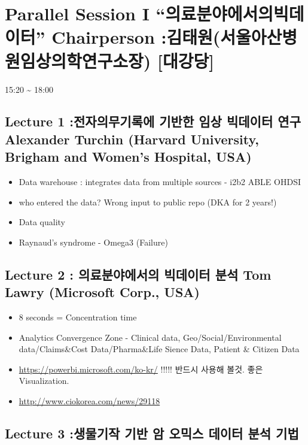 \documentclass[]{book}
\providecommand{\tightlist}{%
  \setlength{\itemsep}{0pt}\setlength{\parskip}{0pt}}
\begin{document}
\section{\texorpdfstring{Parallel Session I ``의료분야에서의빅데이터''
Chairperson :김태원(서울아산병원임상의학연구소장)
{[}대강당{]}}{Parallel Session I 의료분야에서의빅데이터 Chairperson :김태원(서울아산병원임상의학연구소장) {[}대강당{]}}}\label{parallel-session-i--chairperson--}

15:20 \textasciitilde{} 18:00

\subsection{Lecture 1 :전자의무기록에 기반한 임상 빅데이터 연구
Alexander Turchin (Harvard University, Brigham and Women's Hospital,
USA)}\label{lecture-1------alexander-turchin-harvard-university-brigham-and-womens-hospital-usa}

\begin{itemize}
\tightlist
\item
  Data warehouse : integrates data from multiple sources - i2b2
  \textbar{} ABLE \textbar{} OHDSI
\item
  who entered the data? Wrong input to public repo (DKA for 2 years!)
\item
  Data quality
\item
  Raynaud's syndrome - Omega3 (Failure)
\end{itemize}

\subsection{Lecture 2 : 의료분야에서의 빅데이터 분석 Tom Lawry
(Microsoft Corp.,
USA)}\label{lecture-2----tom-lawry-microsoft-corp.-usa}

\begin{itemize}
\tightlist
\item
  8 seconds = Concentration time
\item
  Analytics Convergence Zone - Clinical data, Geo/Social/Environmental
  data/Claims\&Cost Data/Pharma\&Life Sience Data, Patient \& Citizen
  Data
\item
  \url{https://powerbi.microsoft.com/ko-kr/} !!!!! 반드시 사용해 볼것.
  좋은 Visualization.
\item
  \url{http://www.ciokorea.com/news/29118}
\end{itemize}

\subsection{Lecture 3 :생물기작 기반 암 오믹스 데이터 분석
기법}\label{lecture-3-------}
\end{document}
